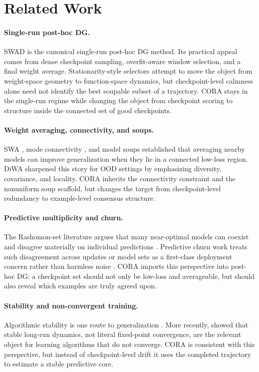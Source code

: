 \documentclass{article}
\newcommand{\ood}{OOD}
\newcommand{\cora}{\textup{\textsc{CORA}}}
\newcommand{\swad}{\textup{\textsc{SWAD}}}
\newcommand{\diwa}{\textup{\textsc{DiWA}}}
\begin{document}
\section{Related Work}

\paragraph{Single-run post-hoc DG.}
\swad{} \citep{cha2021swad} is the canonical single-run post-hoc DG method. Its practical appeal comes from dense checkpoint sampling, overfit-aware window selection, and a final weight average. Stationarity-style selectors attempt to move the object from weight-space geometry to function-space dynamics, but checkpoint-level calmness alone need not identify the best soupable subset of a trajectory. \cora{} stays in the single-run regime while changing the object from checkpoint scoring to structure inside the connected set of good checkpoints.

\paragraph{Weight averaging, connectivity, and soups.}
SWA \citep{izmailov2018swa}, mode connectivity \citep{garipov2018fge}, and model soups \citep{wortsman2022soups} established that averaging nearby models can improve generalization when they lie in a connected low-loss region. \diwa{} \citep{rame2022diwa} sharpened this story for \ood{} settings by emphasizing diversity, covariance, and locality. \cora{} inherits the connectivity constraint and the nonuniform soup scaffold, but changes the target from checkpoint-level redundancy to example-level consensus structure.

\paragraph{Predictive multiplicity and churn.}
The Rashomon-set literature argues that many near-optimal models can coexist and disagree materially on individual predictions \citep{hsu2022rashomon,watsondaniels2024churn}. Predictive churn work treats such disagreement across updates or model sets as a first-class deployment concern rather than harmless noise \citep{watsondaniels2024churn}. \cora{} imports this perspective into post-hoc DG: a checkpoint set should not only be low-loss and averageable, but should also reveal which examples are truly agreed upon.

\paragraph{Stability and non-convergent training.}
Algorithmic stability is one route to generalization \citep{bousquet2002stability,hardt2016sgd}. More recently, \citet{chandramoorthy2022nonconvergent} showed that stable long-run dynamics, not literal fixed-point convergence, are the relevant object for learning algorithms that do not converge. \cora{} is consistent with this perspective, but instead of checkpoint-level drift it uses the completed trajectory to estimate a stable predictive core.
\end{document}
